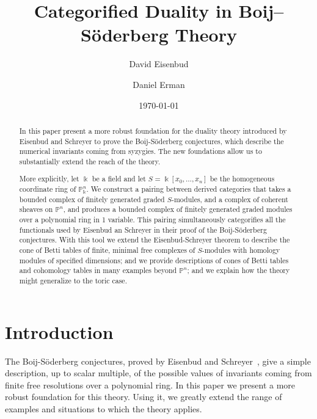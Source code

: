 \documentclass[12pt]{amsart}
\title{Categorified Duality in Boij--S\"oderberg Theory}
\author{David Eisenbud}
\author{Daniel Erman}\thanks{First author supported by an NSF and second author supported by an NSF and by Simons \dots}
\date{\today}
\theoremstyle{definition}
\theoremstyle{remark}
\newcommand{\kk}{\Bbbk}
\newcommand{\PP}{\mathbb{P}}
\renewcommand{\P}{{\mathbb P}}
\begin{document}
\maketitle



\begin{abstract} In this paper present a more robust foundation for the duality theory introduced by Eisenbud and Schreyer to prove the Boij-S\"oderberg conjectures, which describe the numerical invariants coming from syzygies. The new foundations allow us to substantially extend the reach of the theory.

More explicitly, let $\kk$ be a field and let $S = \kk[x_{0}, \dots,x_{n}]$ be the homogeneous coordinate ring of $\PP^{n}_{\kk}$.
We construct a pairing between derived categories that takes a bounded complex of
finitely generated graded $S$-modules,  and a complex of coherent sheaves on $\P^{n}$, and produces a bounded complex of finitely generated graded modules over a polynomial ring in 1 variable. This pairing simultaneously categorifies all the functionals used by Eisenbud an Schreyer in their proof of the Boij-S\"oderberg conjectures. With this tool we extend the Eisenbud-Schreyer theorem to describe the cone of Betti tables of finite, minimal free complexes of $S$-modules with homology modules of specified dimensions;  and we provide descriptions of cones of Betti tables and cohomology tables in many examples beyond $\PP^n$; and we explain how the theory might generalize to the toric case.
\end{abstract}


\section*{Introduction}
The Boij-S\"oderberg conjectures, proved by Eisenbud and Schreyer~\cite{eis-schrey1}, give a simple description, up to scalar multiple, of the possible values of invariants coming from finite free resolutions over a polynomial ring. In this paper we present a more robust foundation for this theory. Using it, we greatly extend the range of examples and situations to which the theory applies.
\end{document}
